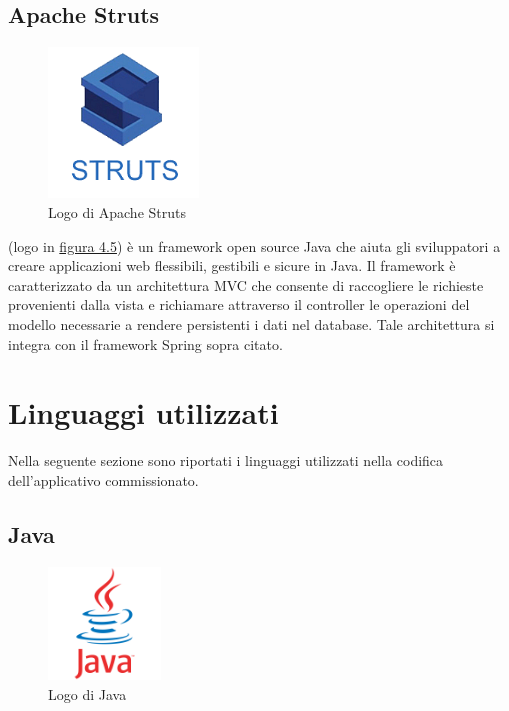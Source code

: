\pagebreak

\subsection{Apache Struts}

\begin{figure}[!h]
	\centering
	\includegraphics[width=4cm]{../images/Struts-logo.png}
	\caption{Logo di Apache Struts}
	\label{fig:AStruts}
\end{figure}

\ap{{[b]}} (logo in {\hyperref[fig:AStruts]{figura 4.5}}) è un framework open source Java che aiuta gli sviluppatori a creare applicazioni web flessibili, gestibili e sicure in Java. Il framework è caratterizzato da un architettura MVC che consente di raccogliere le richieste provenienti dalla vista e richiamare attraverso il controller le operazioni del modello necessarie a rendere persistenti i dati nel database. Tale architettura si integra con il framework Spring sopra citato.

\section{Linguaggi utilizzati}
Nella seguente sezione sono riportati i linguaggi utilizzati nella codifica dell'applicativo commissionato.

\subsection{Java}

\begin{figure}[!h]
	\centering
	\includegraphics[width=3cm]{../images/Java-logo.png}
	\caption{Logo di Java}
	\label{fig:java}
\end{figure}

